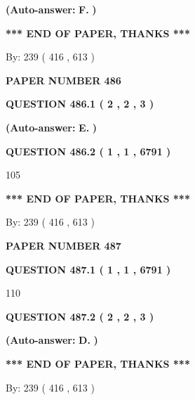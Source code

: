 \documentclass{ctexart}
\begin{document}
 
{\textbf{(Auto-answer:}}
{\textbf{\large{
F.}}}
{\textbf{)}}
 
 
   
   
   
   
\vspace{1.0in} 
{\textbf{\large{ *** END OF PAPER, THANKS *** }}} 
   
   
\hspace{1.0in} By: 
 239 ( 416 ,  613 )
   
   
   
   
\newpage 
\setcounter{page}{ 
   486001 } 
   
   
 {\textbf{ \Large{ PAPER NUMBER  486  }}}
   
   
   
   
  
  
{\textbf{\large{QUESTION
486.1 
 ( 2 , 2 , 3 )
}}}
 
 
{\textbf{(Auto-answer:}}
{\textbf{\large{
E.}}}
{\textbf{)}}
 
 
  
  
{\textbf{\large{QUESTION
486.2 
 ( 1 , 1 , 6791 )
}}}

105
   
   
   
   
\vspace{1.0in} 
{\textbf{\large{ *** END OF PAPER, THANKS *** }}} 
   
   
\hspace{1.0in} By: 
 239 ( 416 ,  613 )
   
   
   
   
\newpage 
\setcounter{page}{ 
   487001 } 
   
   
 {\textbf{ \Large{ PAPER NUMBER  487  }}}
   
   
   
   
  
  
{\textbf{\large{QUESTION
487.1 
 ( 1 , 1 , 6791 )
}}}

110
  
  
{\textbf{\large{QUESTION
487.2 
 ( 2 , 2 , 3 )
}}}
 
 
{\textbf{(Auto-answer:}}
{\textbf{\large{
D.}}}
{\textbf{)}}
 
 
   
   
   
   
\vspace{1.0in} 
{\textbf{\large{ *** END OF PAPER, THANKS *** }}} 
   
   
\hspace{1.0in} By: 
 239 ( 416 ,  613 )
   
   
   
\end{document}
